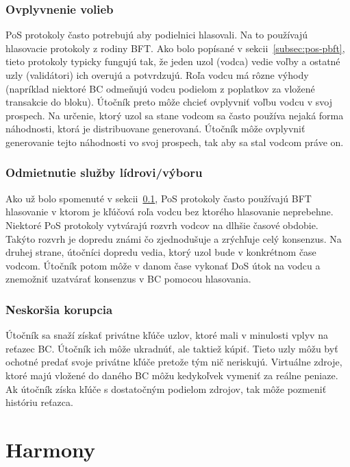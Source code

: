 \subsection{Ovplyvnenie volieb}\label{subsec:grinding-attack}
PoS protokoly často potrebujú aby podielnici hlasovali. Na to používajú hlasovacie protokoly z rodiny BFT. Ako bolo popísané v sekcii~\ref{subsec:pos-pbft}, tieto protokoly typicky fungujú tak, že jeden uzol (vodca) vedie voľby a ostatné uzly (validátori) ich overujú a potvrdzujú. Roľa vodcu má rôzne výhody (napríklad niektoré BC odmeňujú vodcu podielom z poplatkov za vložené transakcie do bloku). Útočník preto môže chcieť ovplyvniť voľbu vodcu v svoj prospech. Na určenie, ktorý uzol sa stane vodcom sa často používa nejaká forma náhodnosti, ktorá je distribuovane generovaná. Útočník môže ovplyvniť generovanie tejto náhodnosti vo svoj prospech, tak aby sa stal vodcom práve on.

\subsection{Odmietnutie služby lídrovi/výboru}\label{subsec:leader-dos}

Ako už bolo spomenuté v sekcii~\ref{subsec:grinding-attack}, PoS protokoly často používajú BFT hlasovanie v ktorom je kľúčová roľa vodcu bez ktorého hlasovanie neprebehne. Niektoré PoS protokoly vytvárajú rozvrh vodcov na dlhšie časové obdobie. Takýto rozvrh je dopredu známi čo zjednodušuje a zrýchľuje celý konsenzus. Na druhej strane, útočníci dopredu vedia, ktorý uzol bude v konkrétnom čase vodcom. Útočník potom môže v danom čase vykonať DoS útok na vodcu a znemožniť uzatvárať konsenzus v BC pomocou hlasovania.

\subsection{Neskoršia korupcia}
Útočník sa snaží získať privátne kľúče uzlov, ktoré mali v minulosti vplyv na reťazec BC. Útočník ich môže ukradnúť, ale taktiež kúpiť. Tieto uzly môžu byť ochotné predať svoje privátne kľúče pretože tým nič neriskujú. Virtuálne zdroje, ktoré majú vložené do daného BC môžu kedykoľvek vymeniť za reálne peniaze. Ak útočník získa kľúče s dostatočným podielom zdrojov, tak môže pozmeniť históriu reťazca. 

\chapter{Harmony}\label{chap:harmony}

